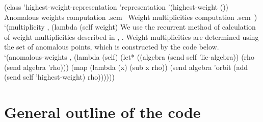 \documentclass[a4paper,10pt]{article}%
\theoremstyle{definition} \newtheorem{Def}{Definition}
\begin{document}
\nwenddocs{}\plusendmoddef\nwstartdeflinemarkup{}\nwenddeflinemarkup
(class 'highest-weight-representation 'representation
       '(highest-weight ())
       \LA{}Anomalous weights computation .scm~{\nwtagstyle{}}\RA{}
       \LA{}Weight multiplicities computation .scm~{\nwtagstyle{}}\RA{})
`(multiplicity , (lambda (self weight)
\nwendcode{}\nwdocspar
We use the recurrent method of calculation of weight multiplicities described in \cite{lyakhovsky1996rra}, \cite{kulish4sfa}. Weight multiplicities are determined using the set of anomalous points, which is constructed by the code below.
\nwenddocs{}\endmoddef\nwstartdeflinemarkup{}\nwenddeflinemarkup
       `(anomalous-weights , 
         (lambda (self)
           (let* ((algebra (send self 'lie-algebra))
                  (rho (send algebra 'rho)))
             (map (lambda (x)
                    (sub x rho))
                  (send algebra 'orbit (add (send self 'highest-weight) rho))))))
\nwendcode{}\nwdocspar

\nwenddocs{}\endmoddef\nwstartdeflinemarkup{}\nwenddeflinemarkup

\nwendcode{}\nwdocspar
\section{General outline of the code}
\label{sec:general-outline-code}
\end{document}
